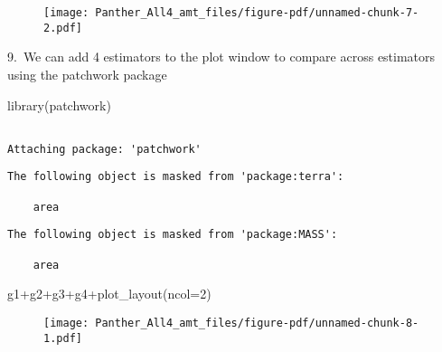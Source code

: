 \documentclass[
  letterpaper,
]{book}
\newenvironment{Shaded}{\begin{snugshade}}{\end{snugshade}}
\newcommand{\AttributeTok}[1]{\textcolor[rgb]{0.40,0.45,0.13}{#1}}
\newcommand{\DecValTok}[1]{\textcolor[rgb]{0.68,0.00,0.00}{#1}}
\newcommand{\FunctionTok}[1]{\textcolor[rgb]{0.28,0.35,0.67}{#1}}
\newcommand{\NormalTok}[1]{\textcolor[rgb]{0.00,0.23,0.31}{#1}}
\newcommand{\SpecialCharTok}[1]{\textcolor[rgb]{0.37,0.37,0.37}{#1}}
\begin{document}
\begin{figure}[H]

{\centering \texttt{[image: Panther\_All4\_amt\_files/figure-pdf/unnamed-chunk-7-2.pdf]}

}

\end{figure}

9.~We can add 4 estimators to the plot window to compare across
estimators using the patchwork package

\begin{Shaded}
\begin{Highlighting}[]
\FunctionTok{library}\NormalTok{(patchwork)}
\end{Highlighting}
\end{Shaded}

\begin{verbatim}

Attaching package: 'patchwork'
\end{verbatim}

\begin{verbatim}
The following object is masked from 'package:terra':

    area
\end{verbatim}

\begin{verbatim}
The following object is masked from 'package:MASS':

    area
\end{verbatim}

\begin{Shaded}
\begin{Highlighting}[]
\NormalTok{g1}\SpecialCharTok{+}\NormalTok{g2}\SpecialCharTok{+}\NormalTok{g3}\SpecialCharTok{+}\NormalTok{g4}\SpecialCharTok{+}\FunctionTok{plot\_layout}\NormalTok{(}\AttributeTok{ncol=}\DecValTok{2}\NormalTok{)}
\end{Highlighting}
\end{Shaded}

\begin{figure}[H]

{\centering \texttt{[image: Panther\_All4\_amt\_files/figure-pdf/unnamed-chunk-8-1.pdf]}

}

\end{figure}
\end{document}
